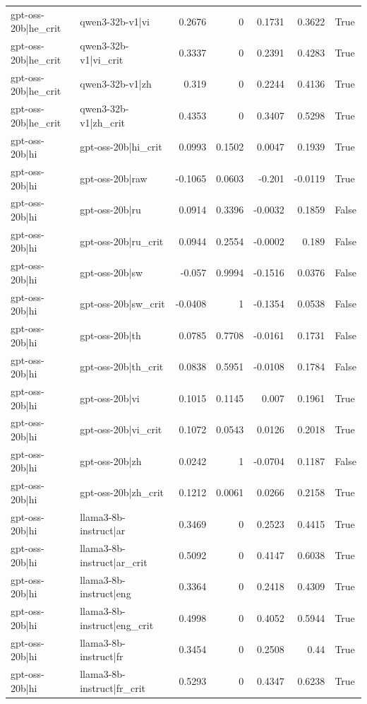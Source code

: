 \begin{table}
\begin{tabular}{l l r r r r l}
gpt-oss-20b|he_crit & qwen3-32b-v1|vi & 0.2676 & 0 & 0.1731 & 0.3622 & True \\
gpt-oss-20b|he_crit & qwen3-32b-v1|vi_crit & 0.3337 & 0 & 0.2391 & 0.4283 & True \\
gpt-oss-20b|he_crit & qwen3-32b-v1|zh & 0.319 & 0 & 0.2244 & 0.4136 & True \\
gpt-oss-20b|he_crit & qwen3-32b-v1|zh_crit & 0.4353 & 0 & 0.3407 & 0.5298 & True \\
gpt-oss-20b|hi & gpt-oss-20b|hi_crit & 0.0993 & 0.1502 & 0.0047 & 0.1939 & True \\
gpt-oss-20b|hi & gpt-oss-20b|raw & -0.1065 & 0.0603 & -0.201 & -0.0119 & True \\
gpt-oss-20b|hi & gpt-oss-20b|ru & 0.0914 & 0.3396 & -0.0032 & 0.1859 & False \\
gpt-oss-20b|hi & gpt-oss-20b|ru_crit & 0.0944 & 0.2554 & -0.0002 & 0.189 & False \\
gpt-oss-20b|hi & gpt-oss-20b|sw & -0.057 & 0.9994 & -0.1516 & 0.0376 & False \\
gpt-oss-20b|hi & gpt-oss-20b|sw_crit & -0.0408 & 1 & -0.1354 & 0.0538 & False \\
gpt-oss-20b|hi & gpt-oss-20b|th & 0.0785 & 0.7708 & -0.0161 & 0.1731 & False \\
gpt-oss-20b|hi & gpt-oss-20b|th_crit & 0.0838 & 0.5951 & -0.0108 & 0.1784 & False \\
gpt-oss-20b|hi & gpt-oss-20b|vi & 0.1015 & 0.1145 & 0.007 & 0.1961 & True \\
gpt-oss-20b|hi & gpt-oss-20b|vi_crit & 0.1072 & 0.0543 & 0.0126 & 0.2018 & True \\
gpt-oss-20b|hi & gpt-oss-20b|zh & 0.0242 & 1 & -0.0704 & 0.1187 & False \\
gpt-oss-20b|hi & gpt-oss-20b|zh_crit & 0.1212 & 0.0061 & 0.0266 & 0.2158 & True \\
gpt-oss-20b|hi & llama3-8b-instruct|ar & 0.3469 & 0 & 0.2523 & 0.4415 & True \\
gpt-oss-20b|hi & llama3-8b-instruct|ar_crit & 0.5092 & 0 & 0.4147 & 0.6038 & True \\
gpt-oss-20b|hi & llama3-8b-instruct|eng & 0.3364 & 0 & 0.2418 & 0.4309 & True \\
gpt-oss-20b|hi & llama3-8b-instruct|eng_crit & 0.4998 & 0 & 0.4052 & 0.5944 & True \\
gpt-oss-20b|hi & llama3-8b-instruct|fr & 0.3454 & 0 & 0.2508 & 0.44 & True \\
gpt-oss-20b|hi & llama3-8b-instruct|fr_crit & 0.5293 & 0 & 0.4347 & 0.6238 & True \\

\end{tabular}
\end{table}

